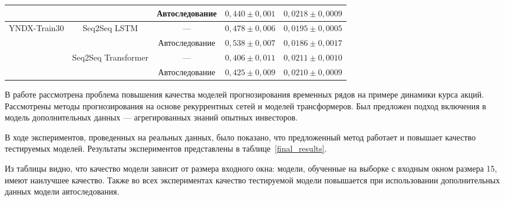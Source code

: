 \begin{table}[h!t]
\begin{center}
{\begin{tabular}{|c|c|c|c|c|}
                            \cline{3-3} \cline{4-4} \cline{5-5}
                            & \multicolumn{1}{|c|}{}                                    & Автоследование & $0{,}440 \pm 0{,}001$ & $0{,}0218 \pm 0{,}0009$ \\
\hline
\hline
\multirow{4}{*}{YNDX-Train30} & \multicolumn{1}{|c|}{\multirow{2}{*}{Seq2Seq LSTM}} & --- & $0{,}478 \pm 0{,}006$ & $0{,}0195 \pm 0{,}0005$ \\ \cline{3-3} \cline{4-4} \cline{5-5}
                            & \multicolumn{1}{|c|}{}                                    & Автоследование & $0{,}538 \pm 0{,}007$ & $0{,}0186 \pm 0{,}0017$ \\ 
                            \cline{2-3} \cline{4-4} \cline{5-5}
                            & \multicolumn{1}{|c|}{\multirow{2}{*}{Seq2Seq Transformer}} & --- & $0{,}406 \pm 0{,}011$ & $0{,}0211 \pm 0{,}0010$ \\ 
                            \cline{3-3} \cline{4-4} \cline{5-5}
                            & \multicolumn{1}{|c|}{}                                    & Автоследование & $0{,}425 \pm 0{,}009$ & $0{,}0210 \pm 0{,}0009$ \\
\hline
\end{tabular}
}
\end{center}
\end{table}


В работе рассмотрена проблема повышения качества моделей прогнозирования временных рядов на примере динамики курса акций. Рассмотрены методы прогнозирования на основе рекуррентных сетей и моделей трансформеров. Был предложен подход включения в модель дополнительных данных --- агрегированных знаний опытных инвесторов.

В ходе экспериментов, проведенных на реальных данных, было показано, что предложенный метод работает и повышает качество тестируемых моделей. Результаты экспериментов представлены в таблице~\ref{final_results}. 

Из таблицы видно, что качество модели зависит от размера входного окна: модели, обученные на выборке с входным окном размера 15, имеют наилучшее качество. Также во всех экспериментах качество тестируемой модели повышается при использовании дополнительных данных модели автоследования.